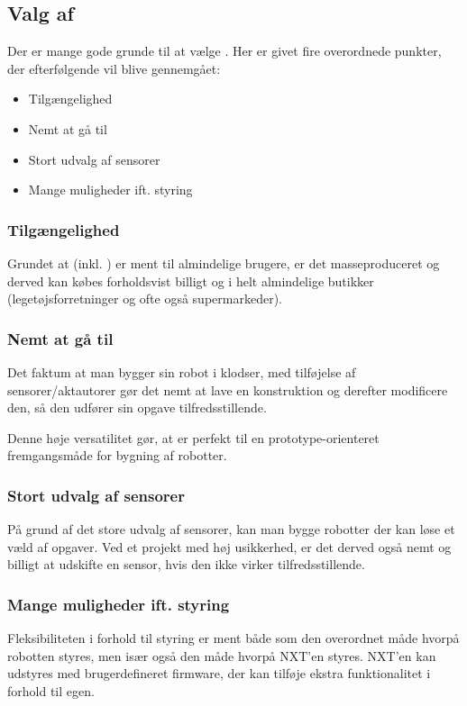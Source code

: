 \subsection{Valg af \legoms}
Der er mange gode grunde til at vælge \legoms.
Her er givet fire overordnede punkter, der efterfølgende vil blive gennemgået:

\begin{itemize}
\item{Tilgængelighed}
\item{Nemt at gå til}
\item{Stort udvalg af sensorer}
\item{Mange muligheder ift. styring}
\end{itemize}

\subsubsection{Tilgængelighed}
Grundet at \lego (inkl. \legoms) er ment til almindelige brugere, er det masseproduceret og derved kan købes forholdsvist billigt og i helt almindelige butikker (legetøjsforretninger og ofte også supermarkeder).

\subsubsection{Nemt at gå til}
Det faktum at man bygger sin robot i \lego klodser, med tilføjelse af \legoms sensorer/aktautorer gør det nemt at lave en konstruktion og derefter modificere den, så den udfører sin opgave tilfredsstillende.

Denne høje versatilitet gør, at \lego er perfekt til en prototype-orienteret fremgangsmåde for bygning af robotter.

\subsubsection{Stort udvalg af sensorer}
På grund af det store udvalg af sensorer, kan man bygge robotter der kan løse et væld af opgaver.
Ved et projekt med høj usikkerhed, er det derved også nemt og billigt at udskifte en sensor, hvis den ikke virker tilfredsstillende.

\subsubsection{Mange muligheder ift. styring}
Fleksibiliteten i forhold til styring er ment både som den overordnet  måde hvorpå robotten styres, men især også den måde hvorpå NXT'en styres.
NXT'en kan udstyres med brugerdefineret firmware, der kan tilføje ekstra funktionalitet i forhold til \legos egen.

